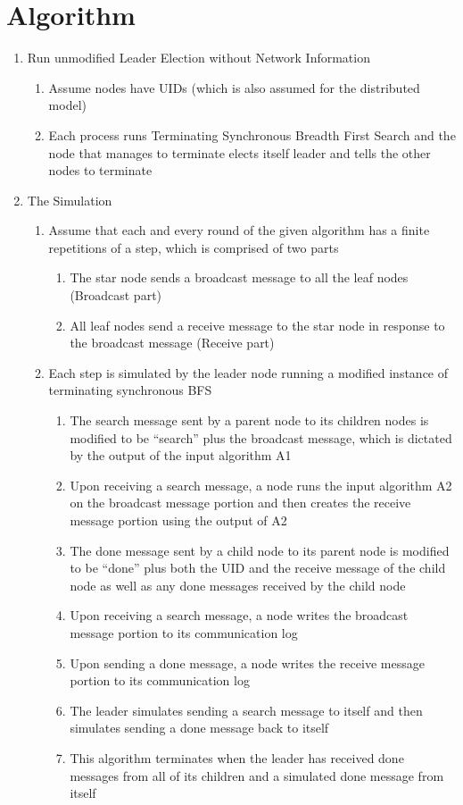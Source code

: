 \documentclass[english]{article}
\begin{document}
\section{Algorithm}

\begin{enumerate}
\item Run unmodified Leader Election without Network Information 

  \begin{enumerate}
  \item Assume nodes have UIDs (which is also assumed for the distributed model)
  \item Each process runs Terminating Synchronous Breadth First Search and the node that manages to terminate elects itself leader and tells the other nodes to terminate
  \end{enumerate}

\item The Simulation

  \begin{enumerate}
  \item Assume that each and every round of the given algorithm has a finite repetitions of a step, which is comprised of two parts
    \begin{enumerate}
    \item The star node sends a broadcast message to all the leaf nodes (Broadcast part)
    \item All leaf nodes send a receive message to the star node in response to the broadcast message (Receive part)
    \end{enumerate}

  \item Each step is simulated by the leader node running a modified instance of terminating synchronous BFS
    \begin{enumerate}
    \item The search message sent by a parent node to its children nodes is modified to be ``search'' plus the broadcast message, which is dictated by the output of the input algorithm A1
    \item Upon receiving a search message, a node runs the input algorithm A2 on the broadcast message portion and then creates the receive message portion using the output of A2
    \item The done message sent by a child node to its parent node is modified to be ``done'' plus both the UID and the receive message of the child node as well as any done messages received by the child node 
    \item Upon receiving a search message, a node writes the broadcast message portion to its communication log
    \item Upon sending a done message, a node writes the receive message portion to its communication log
    \item The leader simulates sending a search message to itself and then simulates sending a done message back to itself
    \item This algorithm terminates when the leader has received done messages from all of its children and a simulated done message from itself
    \end{enumerate}


\end{enumerate}
\end{enumerate}
\end{document}
